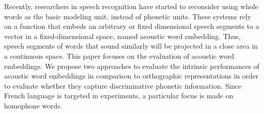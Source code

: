 Recently, researchers in speech recognition have started to reconsider using whole words as the basic modeling unit, instead of phonetic units. These systems rely on a function that embeds an arbitrary or fixed dimensional speech segments to a vector in a fixed-dimensional space, named acoustic word embedding. Thus, speech segments of words that sound similarly will be projected in a close area in a continuous space. This paper focuses on the evaluation of acoustic word embeddings. We propose two approaches to evaluate the intrinsic performances of acoustic word embeddings in comparison to orthographic representations in order to evaluate whether they capture discriminative phonetic information. Since French language is targeted in experiments, a particular focus is made on homophone words.

